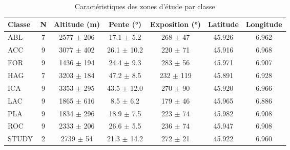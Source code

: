 
\begin{table}[htbp]
\centering
\caption{Caractéristiques des zones d'étude par classe}
\label{tab:study_areas}
\begin{tabular}{|l|c|c|c|c|c|c|}
\hline
\textbf{Classe} & \textbf{N} & \textbf{Altitude (m)} & \textbf{Pente (°)} & \textbf{Exposition (°)} & \textbf{Latitude} & \textbf{Longitude} \\
\hline
ABL & 7 & 2577 $\pm$ 206 & 17.1 $\pm$ 5.2 & 268 $\pm$ 47 & 45.926 & 6.962 \\
ACC & 9 & 3077 $\pm$ 402 & 26.1 $\pm$ 10.2 & 220 $\pm$ 71 & 45.916 & 6.968 \\
FOR & 9 & 1436 $\pm$ 194 & 24.4 $\pm$ 9.3 & 283 $\pm$ 56 & 45.971 & 6.907 \\
HAG & 7 & 3203 $\pm$ 184 & 47.2 $\pm$ 8.5 & 232 $\pm$ 119 & 45.891 & 6.928 \\
ICA & 9 & 3353 $\pm$ 295 & 43.5 $\pm$ 12.0 & 270 $\pm$ 90 & 45.920 & 6.966 \\
LAC & 9 & 1865 $\pm$ 616 & 8.5 $\pm$ 6.2 & 179 $\pm$ 46 & 45.965 & 6.886 \\
PLA & 9 & 1834 $\pm$ 296 & 18.9 $\pm$ 7.5 & 223 $\pm$ 74 & 45.982 & 6.908 \\
ROC & 9 & 2333 $\pm$ 206 & 26.6 $\pm$ 5.5 & 236 $\pm$ 74 & 45.947 & 6.908 \\
STUDY & 2 & 2739 $\pm$ 54 & 21.3 $\pm$ 14.2 & 272 $\pm$ 21 & 45.922 & 6.960 \\

\hline
\end{tabular}
\end{table}
